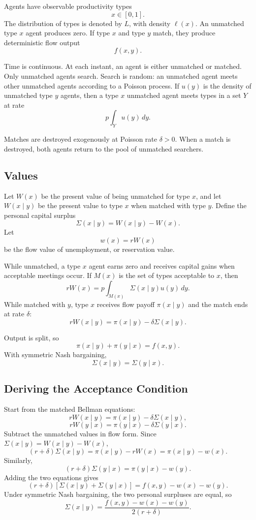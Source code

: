 \documentclass[11pt]{article}
\newcommand{\1}{\mathbf{1}}
\begin{document}
Agents have observable productivity types
\[
x \in [0,1].
\]
The distribution of types is denoted by $L$, with density $\ell(x)$. An unmatched type $x$ agent produces zero. If type $x$ and type $y$ match, they produce deterministic flow output
\[
f(x,y).
\]

Time is continuous. At each instant, an agent is either unmatched or matched. Only unmatched agents search. Search is random: an unmatched agent meets other unmatched agents according to a Poisson process. If $u(y)$ is the density of unmatched type $y$ agents, then a type $x$ unmatched agent meets types in a set $Y$ at rate
\[
p\int_Y u(y)\,dy.
\]

Matches are destroyed exogenously at Poisson rate $\delta>0$. When a match is destroyed, both agents return to the pool of unmatched searchers.

\subsection{Values}

Let $W(x)$ be the present value of being unmatched for type $x$, and let $W(x\mid y)$ be the present value to type $x$ when matched with type $y$. Define the personal capital surplus
\[
\Sigma(x\mid y) = W(x\mid y)-W(x).
\]
Let
\[
w(x) = rW(x)
\]
be the flow value of unemployment, or reservation value.

While unmatched, a type $x$ agent earns zero and receives capital gains when acceptable meetings occur. If $M(x)$ is the set of types acceptable to $x$, then
\[
rW(x)
=
p\int_{M(x)} \Sigma(x\mid y)u(y)\,dy.
\]
While matched with $y$, type $x$ receives flow payoff $\pi(x\mid y)$ and the match ends at rate $\delta$:
\[
rW(x\mid y)
=
\pi(x\mid y)-\delta \Sigma(x\mid y).
\]

Output is split, so
\[
\pi(x\mid y)+\pi(y\mid x)=f(x,y).
\]
With symmetric Nash bargaining,
\[
\Sigma(x\mid y)=\Sigma(y\mid x).
\]

\subsection{Deriving the Acceptance Condition}

Start from the matched Bellman equations:
\[
rW(x\mid y)=\pi(x\mid y)-\delta \Sigma(x\mid y),
\]
\[
rW(y\mid x)=\pi(y\mid x)-\delta \Sigma(y\mid x).
\]
Subtract the unmatched values in flow form. Since $\Sigma(x\mid y)=W(x\mid y)-W(x)$,
\[
(r+\delta)\Sigma(x\mid y)=\pi(x\mid y)-rW(x)
=
\pi(x\mid y)-w(x).
\]
Similarly,
\[
(r+\delta)\Sigma(y\mid x)=\pi(y\mid x)-w(y).
\]
Adding the two equations gives
\[
(r+\delta)\left[\Sigma(x\mid y)+\Sigma(y\mid x)\right]
=
f(x,y)-w(x)-w(y).
\]
Under symmetric Nash bargaining, the two personal surpluses are equal, so
\[
\Sigma(x\mid y)
=
\frac{f(x,y)-w(x)-w(y)}{2(r+\delta)}.
\]
\end{document}
